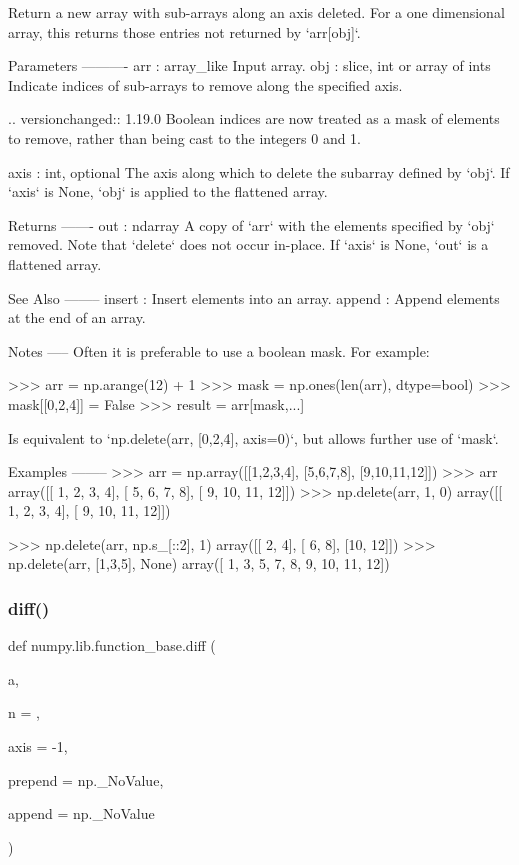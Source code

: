 \begin{DoxyVerb}Return a new array with sub-arrays along an axis deleted. For a one
dimensional array, this returns those entries not returned by
`arr[obj]`.

Parameters
----------
arr : array_like
    Input array.
obj : slice, int or array of ints
    Indicate indices of sub-arrays to remove along the specified axis.

    .. versionchanged:: 1.19.0
        Boolean indices are now treated as a mask of elements to remove,
        rather than being cast to the integers 0 and 1.

axis : int, optional
    The axis along which to delete the subarray defined by `obj`.
    If `axis` is None, `obj` is applied to the flattened array.

Returns
-------
out : ndarray
    A copy of `arr` with the elements specified by `obj` removed. Note
    that `delete` does not occur in-place. If `axis` is None, `out` is
    a flattened array.

See Also
--------
insert : Insert elements into an array.
append : Append elements at the end of an array.

Notes
-----
Often it is preferable to use a boolean mask. For example:

>>> arr = np.arange(12) + 1
>>> mask = np.ones(len(arr), dtype=bool)
>>> mask[[0,2,4]] = False
>>> result = arr[mask,...]

Is equivalent to `np.delete(arr, [0,2,4], axis=0)`, but allows further
use of `mask`.

Examples
--------
>>> arr = np.array([[1,2,3,4], [5,6,7,8], [9,10,11,12]])
>>> arr
array([[ 1,  2,  3,  4],
       [ 5,  6,  7,  8],
       [ 9, 10, 11, 12]])
>>> np.delete(arr, 1, 0)
array([[ 1,  2,  3,  4],
       [ 9, 10, 11, 12]])

>>> np.delete(arr, np.s_[::2], 1)
array([[ 2,  4],
       [ 6,  8],
       [10, 12]])
>>> np.delete(arr, [1,3,5], None)
array([ 1,  3,  5,  7,  8,  9, 10, 11, 12])\end{DoxyVerb}
 \mbox{\label{namespacenumpy_1_1lib_1_1function__base_a2dac0aee3f8e493997dd21a4ab61a443}} 
\subsubsection{\texorpdfstring{diff()}{diff()}}
{\footnotesize\ttfamily def numpy.\+lib.\+function\+\_\+base.\+diff (\begin{DoxyParamCaption}\item[{}]{a,  }\item[{}]{n = {},  }\item[{}]{axis = {\ttfamily -\/1},  }\item[{}]{prepend = {\ttfamily np.\+\_\+NoValue},  }\item[{}]{append = {\ttfamily np.\+\_\+NoValue} }\end{DoxyParamCaption})}

